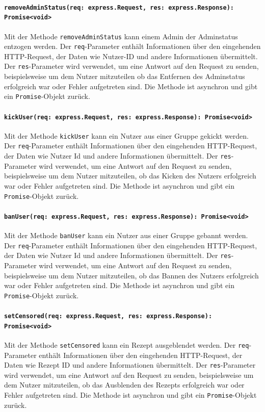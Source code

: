 \documentclass{entwurfsheft}
\begin{document}
\begin{sloppypar}
\paragraph{\texttt{removeAdminStatus(req: express.Request, res: express.Response): Promise<void>\\}}
Mit der Methode \texttt{removeAdminStatus} kann einem Admin der Adminstatus entzogen werden. Der \texttt{req}-Parameter enthält Informationen über den eingehenden HTTP-Request, der Daten wie Nutzer-ID und andere Informationen übermittelt. Der \texttt{res}-Parameter wird verwendet, um eine Antwort auf den Request zu senden, beispielsweise um dem Nutzer mitzuteilen ob das Entfernen des Adminstatus erfolgreich war oder Fehler aufgetreten sind. Die Methode ist asynchron und gibt ein \texttt{Promise}-Objekt zurück.
\paragraph{\texttt{kickUser(req: express.Request, res: express.Response): Promise<void>}}
Mit der Methode \texttt{kickUser} kann ein Nutzer aus einer Gruppe gekickt werden. Der \texttt{req}-Parameter enthält Informationen über den eingehenden HTTP-Request, der Daten wie Nutzer Id und andere Informationen übermittelt. Der \texttt{res}-Parameter wird verwendet, um eine Antwort auf den Request zu senden, beispielsweise um dem Nutzer mitzuteilen, ob das Kicken des Nutzers erfolgreich war oder Fehler aufgetreten sind.
Die Methode ist asynchron und gibt ein \texttt{Promise}-Objekt zurück.
\paragraph{\texttt{banUser(req: express.Request, res: express.Response): Promise<void>\\}}
Mit der Methode \texttt{banUser} kann ein Nutzer aus einer Gruppe gebannt werden. Der \texttt{req}-Parameter enthält Informationen über den eingehenden HTTP-Request, der Daten wie Nutzer Id und andere Informationen übermittelt. Der \texttt{res}-Parameter wird verwendet, um eine Antwort auf den Request zu senden, beispielsweise um dem Nutzer mitzuteilen, ob das Bannen des Nutzers erfolgreich war oder Fehler aufgetreten sind. Die Methode ist asynchron und gibt ein \texttt{Promise}-Objekt zurück.
\paragraph{\texttt{setCensored(req: express.Request, res: express.Response): Promise<void>\\}}
Mit der Methode \texttt{setCensored} kann ein Rezept ausgeblendet werden. Der \texttt{req}-Parameter enthält Informationen über den eingehenden HTTP-Request, der Daten wie Rezept ID und andere Informationen übermittelt. Der \texttt{res}-Parameter wird verwendet, um eine Antwort auf den Request zu senden, beispielsweise um dem Nutzer mitzuteilen, ob das Ausblenden des Rezepts erfolgreich war oder Fehler aufgetreten sind. Die Methode ist asynchron und gibt ein \texttt{Promise}-Objekt zurück.


\end{sloppypar}
\end{document}
